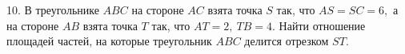 10. В треугольнике $ABC$ на стороне $AC$ взята точка $S$ так, что $AS=SC=6,$ а на стороне $AB$ взята точка $T$ так, что $AT=2,\ TB=4.$ Найти отношение площадей частей, на которые треугольник $ABC$ делится отрезком $ST.$\\
